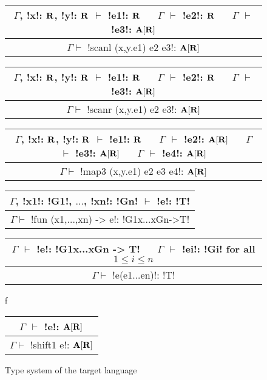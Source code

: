 \begin{figure*}[tb]
    \centering

    \begin{tabular}{c}
        $\Gamma$, !x!: $\mathbf{R}$, !y!: $\mathbf{R}$ $\vdash$ !e1!: $\mathbf{R}$ 
        $\quad$ $\Gamma$ $\vdash$ !e2!: $\mathbf{R}$
        $\quad$ $\Gamma$ $\vdash$ !e3!: $\mathbf{A}[\mathbf{R}]$
        \\\hline  
        $\Gamma \vdash$ !scanl (x,y.e1) e2 e3!: $\mathbf{A}[\mathbf{R}]$
    \end{tabular}

    \begin{tabular}{c}
        $\Gamma$, !x!: $\mathbf{R}$, !y!: $\mathbf{R}$ $\vdash$ !e1!: $\mathbf{R}$ 
        $\quad$ $\Gamma$ $\vdash$ !e2!: $\mathbf{R}$
        $\quad$ $\Gamma$ $\vdash$ !e3!: $\mathbf{A}[\mathbf{R}]$
        \\\hline  
        $\Gamma \vdash$ !scanr (x,y.e1) e2 e3!: $\mathbf{A}[\mathbf{R}]$
    \end{tabular}

    \begin{tabular}{c}
        $\Gamma$, !x!: $\mathbf{R}$, !y!: $\mathbf{R}$ $\vdash$ !e1!: $\mathbf{R}$ 
        $\quad$ $\Gamma$ $\vdash$ !e2!: $\mathbf{A}[\mathbf{R}]$
        $\quad$ $\Gamma$ $\vdash$ !e3!: $\mathbf{A}[\mathbf{R}]$
        $\quad$ $\Gamma$ $\vdash$ !e4!: $\mathbf{A}[\mathbf{R}]$
        \\\hline  
        $\Gamma \vdash$ !map3 (x,y.e1) e2 e3 e4!: $\mathbf{A}[\mathbf{R}]$
    \end{tabular}

    \begin{tabular}{c}
        $\Gamma$, !x1!: !G1!, $\ldots$, !xn!: !Gn! $\vdash$ !e!: !T! 
        \\\hline  
        $\Gamma \vdash$ !fun (x1,...,xn) -> e!: !G1x...xGn->T!
    \end{tabular}

    \begin{tabular}{c}
        $\Gamma$ $\vdash$ !e!: !G1x...xGn -> T!
        $\quad$ $\Gamma$ $\vdash$ !ei!: !Gi! for all $1\leq i\leq n$
        \\\hline  
        $\Gamma \vdash$ !e(e1...en)!: !T!
    \end{tabular}f

    \begin{tabular}{c}
        $\Gamma$ $\vdash$ !e!: $\mathbf{A}[\mathbf{R}]$
        \\\hline  
        $\Gamma \vdash$ !shift1 e!: $\mathbf{A}[\mathbf{R}]$
    \end{tabular}

    \vspace{-0.2cm}
    \caption{Type system of the target language}
    \vspace{-0.4cm}
    \label{fig:target_typesystem}
    \end{figure*}